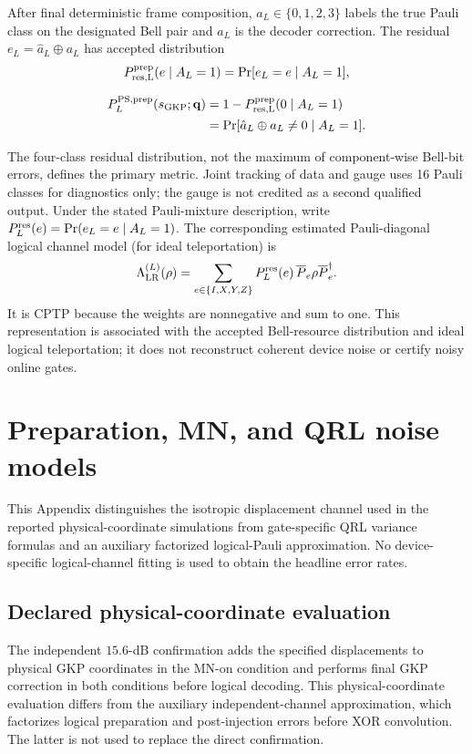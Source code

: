 \documentclass[aps,
prx,
superscriptaddress,
reprint,
longbibliography,
floatfix]{revtex4-2}
\begin{document}
After final deterministic frame composition, $a_L\in\{0,1,2,3\}$ labels the true Pauli class on the designated Bell pair and $\hat a_L$ is the decoder correction. The residual $e_L=\hat a_L\oplus a_L$ has accepted distribution
\begin{equation}
P_{\rm res,L}^{\rm prep}(e\mid A_L=1)
=\Pr[e_L=e\mid A_L=1],
\label{eq:primary_residual_channel}
\end{equation}

\begin{align}
P_{L}^{\rm PS,prep}(s_{\rm GKP};\mathbf q)
&=1-P_{\rm res,L}^{\rm prep}(0\mid A_L=1)
\nonumber\\
&=\Pr[\hat a_L\oplus a_L\neq0\mid A_L=1].
\label{eq:primary_canonical_failure}
\end{align}

The four-class residual distribution, not the maximum of component-wise Bell-bit errors, defines the primary metric. Joint tracking of data and gauge uses 16 Pauli classes for diagnostics only; the gauge is not credited as a second qualified output. Under the stated Pauli-mixture description, write $P_L^{\rm res}(e)=\Pr(e_L=e\mid A_L=1)$. The corresponding estimated Pauli-diagonal logical channel model (for ideal teleportation) is
\begin{equation*}
\Lambda_{\rm LR}^{(L)}(\rho)
=\sum_{e\in\{I,X,Y,Z\}}P_L^{\rm res}(e)\,
\overline P_e\rho\overline P_e^\dagger.
\end{equation*}
It is CPTP because the weights are nonnegative and sum to one. This representation is associated with the accepted Bell-resource distribution and ideal logical teleportation; it does not reconstruct coherent device noise or certify noisy online gates.


\section{Preparation, MN, and QRL noise models}\label{app:qrl_insertion_details}
This Appendix distinguishes the isotropic displacement channel used in the reported physical-coordinate simulations from gate-specific QRL variance formulas and an auxiliary factorized logical-Pauli approximation. No device-specific logical-channel fitting is used to obtain the headline error rates.

\subsection{Declared physical-coordinate evaluation}\label{sec:mbqc_insertion_noise}
The independent $15.6$-dB confirmation adds the specified displacements to physical GKP coordinates in the MN-on condition and performs final GKP correction in both conditions before logical decoding. This physical-coordinate evaluation differs from the auxiliary independent-channel approximation, which factorizes logical preparation and post-injection errors before XOR convolution. The latter is not used to replace the direct confirmation.
\end{document}

